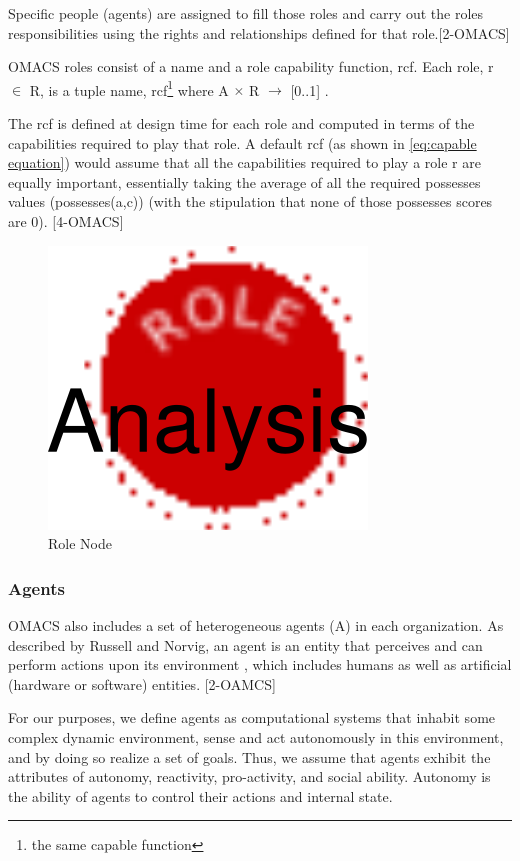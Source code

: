 Specific people (agents) are assigned to fill those roles and carry out the roles responsibilities using the rights and
relationships defined for that role.[2-OMACS]

OMACS roles consist of a name and a role capability function, rcf. Each role, r $\in$ R, is a tuple
\textlangle{} name, rcf\footnote{the same capable function} \textrangle{}  where A $\times$ R $\rightarrow$ {[}0..1{]} .


The rcf is defined at design time for each role and computed in terms of 
the capabilities required to play that role.
A default rcf (as shown in \ref{eq:capable equation}) 
would assume that all the capabilities required to play a role r are equally important,
essentially taking the average of all the required possesses values (possesses(a,c))
(with the stipulation that none of those possesses scores are 0). [4-OMACS]

\begin{figure}[th]
	\centering
		\includegraphics{chapiter1/img/Role}
	\caption{\label{fig:Role Node}Role Node }
\end{figure}

\subsubsection{ Agents}

OMACS also includes a set of heterogeneous agents (A) in each organization. 
As described by Russell and Norvig, an agent is an entity that perceives and can perform actions upon its
environment  , which includes humans as well as artificial (hardware or software) entities. [2-OAMCS]

For our purposes, we define agents as computational systems that inhabit some complex dynamic
environment, sense and act autonomously in this environment, and by doing so realize a set of
goals. Thus, we assume that agents exhibit the attributes of autonomy, reactivity, pro-activity, and
social ability. Autonomy is the ability of agents to control their actions and internal state.


